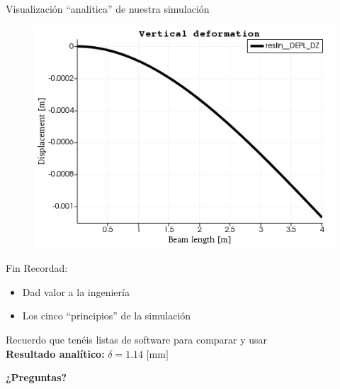 \documentclass[12pt]{beamer}
\begin{document}
\begin{frame}{Visualización ``analítica'' de nuestra simulación}
	\begin{figure}
		\centering
		\hspace*{-1em}\includegraphics[width=1\linewidth]{postprodefline}
		\label{fig:lineresult}
	\end{figure}
\end{frame}

\begin{frame}{Fin}
	Recordad:
	\begin{itemize}
		\item Dad valor a la ingeniería
		\item Los cinco ``principios'' de la simulación
	\end{itemize}
	Recuerdo que tenéis listas de software para comparar y usar \\
	
	\textbf{Resultado analítico:} $\delta = 1.14\text{ [mm]}$
	
	\vfill
	\begin{center}
		\LARGE \textbf{¿Preguntas?}
	\end{center}
\end{frame}
\end{document}
